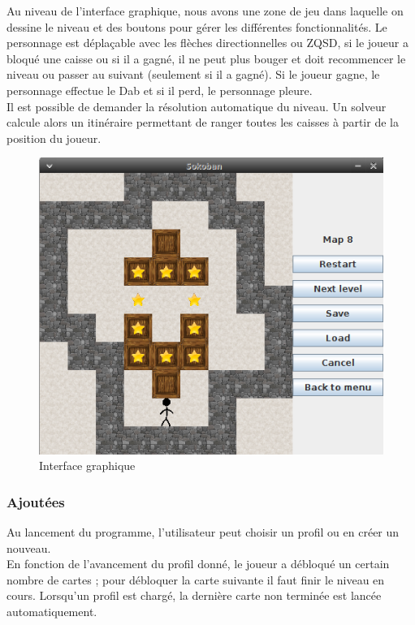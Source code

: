 \documentclass[a4paper,12pt]{article} %
\begin{document}
Au niveau de l'interface graphique, nous avons une zone de jeu dans laquelle on dessine le niveau et des boutons pour gérer les différentes fonctionnalités. Le personnage est déplaçable avec les flèches directionnelles ou ZQSD, si le joueur a bloqué une caisse ou si il a gagné, il ne peut plus bouger et doit recommencer le niveau ou passer au suivant (seulement si il a gagné). Si le joueur gagne, le personnage effectue le Dab et si il perd, le personnage pleure.\\

Il est possible de demander la résolution automatique du niveau. Un solveur calcule alors un itinéraire permettant de ranger toutes les caisses à partir de la position du joueur.

\begin{figure}[!h]
\centering
\includegraphics[scale=0.5]{images/Capture2.png}
\caption{Interface graphique}
\end{figure}

\subsubsection*{Ajoutées}

Au lancement du programme, l'utilisateur peut choisir un profil ou en créer un nouveau.\\
En fonction de l'avancement du profil donné, le joueur a débloqué un certain nombre de cartes ; pour débloquer la carte suivante il faut finir le niveau en cours. Lorsqu'un profil est chargé, la dernière carte non terminée est lancée automatiquement.\\
\end{document}
